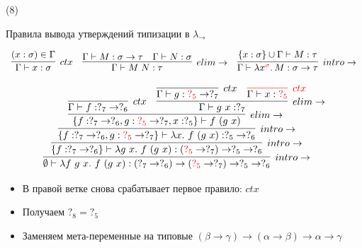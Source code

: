     \begin{frame}[t, noframenumbering]{\btypename (8)}
        \begin{block}{Правила вывода утверждений типизации в $\lambda_{\rightarrow}$}
            \vspace{-1em}
            \begin{center}
                \[
                    \begin{array}{l c r}
                        \infer[ctx]{\Gamma \vdash x: \sigma}{(x: \sigma) \in \Gamma}
                        &
                        \infer[elim\to]{\Gamma \vdash M\;N : \tau}{\Gamma \vdash M : \sigma \to \tau & \Gamma \vdash N : \sigma}
                        &
                        \infer[intro\to]{\Gamma \vdash \lambda x^{\color{red} \sigma}\ldotp M : \sigma \to \tau}{\{x : \sigma\} \cup \Gamma \vdash M : \tau}
                    \end{array}
                \]
            \end{center}
        \end{block}
        \[
            \infer[intro\to]{\emptyset \vdash \lambda f~g~x.~f~(g~x) : (?_7 \to ?_6) \to ({\color{red} ?_5} \to ?_7) \to ?_5 \to ?_6}{
                \infer[intro\to]{\{f: ?_7 \to ?_6\} \vdash \lambda g~x.~f~(g~x) : ({\color{red} ?_5} \to ?_7) \to ?_5 \to ?_6}{
                    \infer[intro\to]{\{f: ?_7 \to ?_6, g: {\color{red}?_5} \to ?_7\} \vdash \lambda x.~f~(g~x) : ?_5 \to ?_6 }{
                        \infer[elim\to]{\{f: ?_7 \to ?_6, g: {\color{red}?_5} \to ?_7, x: ?_5\} \vdash f~(g~x) }{
                            \infer[ctx]{\Gamma \vdash f : ?_7 \to ?_6}{} &
                            \infer[elim\to]{\Gamma \vdash g \ap x : ?_7}{
                                \infer[ctx]{\Gamma \vdash g : {\color{red}?_5} \to ?_7}{} &
                                \color{red} \infer[ctx]{\color{black} \Gamma \vdash x : {\color{red} ?_5}}{}
                            }}}}}
        \]
        \vspace{-1em}
        \begin{itemize}
            \item В правой ветке снова срабатывает первое правило: $ctx$
            \item Получаем $?_8 = ?_5$
            \item[\answer] Заменяем мета-переменные на типовые $(\beta \to \gamma) \to (\alpha \to \beta) \to \alpha \to \gamma$
        \end{itemize}
    \end{frame}


